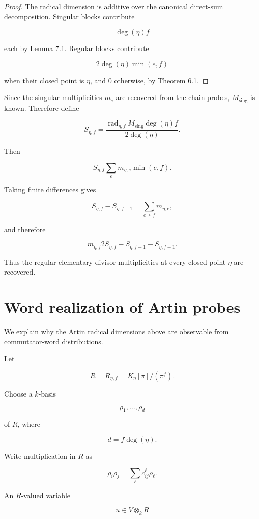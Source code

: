 \documentclass[11pt]{article}
\begin{document}
\begin{proof}

The radical dimension is additive over the canonical direct-sum decomposition. Singular blocks contribute

\[
\deg(\eta)f
\]

each by Lemma 7.1. Regular blocks contribute

\[
2\deg(\eta)\min(e,f)
\]

when their closed point is $\eta$, and $0$ otherwise, by Theorem 6.1.

\end{proof}

Since the singular multiplicities $m_e$ are recovered from the chain probes, $M_{\mathrm{sing}}$ is known. Therefore define

\[
S_{\eta,f}
=
\frac{
\operatorname{rad}_{\eta,f}
M_{\mathrm{sing}}\deg(\eta)f
}{
2\deg(\eta)
}.
\]

Then

\[
\boxed{
S_{\eta,f}
\sum_e m_{\eta,e}\min(e,f).
}
\]

Taking finite differences gives

\[
S_{\eta,f}-S_{\eta,f-1}
=
\sum_{e\ge f}m_{\eta,e},
\]

and therefore

\[
\boxed{
m_{\eta,f}
2S_{\eta,f}-S_{\eta,f-1}-S_{\eta,f+1}.
}
\]

Thus the regular elementary-divisor multiplicities at every closed point $\eta$ are recovered.

\section{Word realization of Artin probes}

We explain why the Artin radical dimensions above are observable from commutator-word distributions.

Let

\[
R=R_{\eta,f}=K_\eta[\pi]/(\pi^f).
\]

Choose a $k$-basis

\[
\rho_1,\ldots,\rho_d
\]

of $R$, where

\[
d=f\deg(\eta).
\]

Write multiplication in $R$ as

\[
\rho_i\rho_j=\sum_\ell c_{ij}^{\ell}\rho_\ell.
\]

An $R$-valued variable

\[
u\in V\otimes_k R
\]
\end{document}
